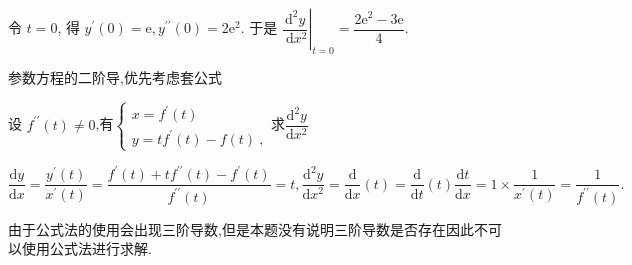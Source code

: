 \documentclass[8pt a4paper, oneside, UTF8]{ctexbook}  %
\begin{document}
\begin{sloppypar}
\begin{solution}
$$        $$
        令 $t=0$, 得 $y^{\prime}(0)=\mathrm{e}, y^{\prime \prime}(0)=2 \mathrm{e}^2$. 于是 $\left.\dfrac{\mathrm{d}^2 y}{\mathrm{~d} x^2}\right|_{t=0}=\dfrac{2 \mathrm{e}^2-3 \mathrm{e}}{4}$.
    \end{solution}
    \begin{note}
        参数方程的二阶导,优先考虑套公式
    \end{note}
    \begin{problem}
        设 $f^{\prime\prime}(t)\neq0$,有$\begin{cases}x=f^{\prime}(t)\:\\y=tf^{\prime}(t)-f(t)\:,\end{cases}$求$\dfrac{\mathrm{d}^2y}{\mathrm{d}x^2}$        
    \end{problem}
    \begin{solution}
       $\dfrac{\mathrm{d}y}{\mathrm{d}x}=\dfrac{y^{\prime}(t)}{x^{\prime}(t)}=\dfrac{f^{\prime}(t)+tf^{\prime\prime}(t)-f^{\prime}(t)}{f^{\prime\prime}(t)}=t ,\dfrac{\mathrm{d}^{2}y}{\mathrm{d}x^{2}}=\dfrac{\mathrm{d}}{\mathrm{d}x}(t)=\dfrac{\mathrm{d}}{\mathrm{d}t}(t) \dfrac{\mathrm{d}t}{\mathrm{d}x}=1\times\dfrac{1}{x^{\prime}(t)}=\dfrac{1}{f^{\prime\prime}(t)}.$
    \end{solution}
    \begin{note}
        由于公式法的使用会出现三阶导数,但是本题没有说明三阶导数是否存在因此不可以使用公式法进行求解.
    \end{note}

\end{sloppypar}
\end{document}
